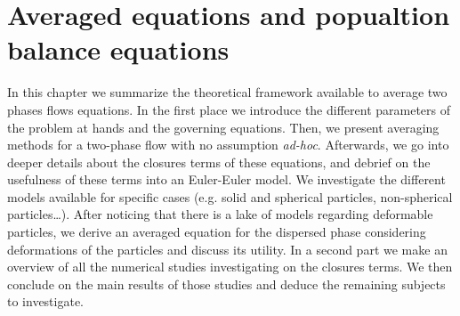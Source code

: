 \chapter{Averaged equations and popualtion balance equations}
\label{chap:avg}

In this chapter we summarize the theoretical framework available to average two phases flows equations. 
In the first place we introduce the different parameters of the problem at hands and the governing equations. 
Then, we present averaging methods for a two-phase flow with no assumption \textit{ad-hoc}.  
Afterwards, we go into deeper details about the closures terms of these equations, and debrief on the usefulness of these terms into an Euler-Euler model. 
We investigate the different models available for specific cases (e.g. solid and spherical particles, non-spherical particles\ldots).
After noticing that there is a lake of models regarding deformable particles, we derive an averaged equation for the dispersed phase considering deformations of the particles and discuss its utility.
In a second part we make an overview of all the numerical studies investigating on the closures terms. 
We then conclude on the main results of those studies and deduce the remaining subjects to investigate. 

